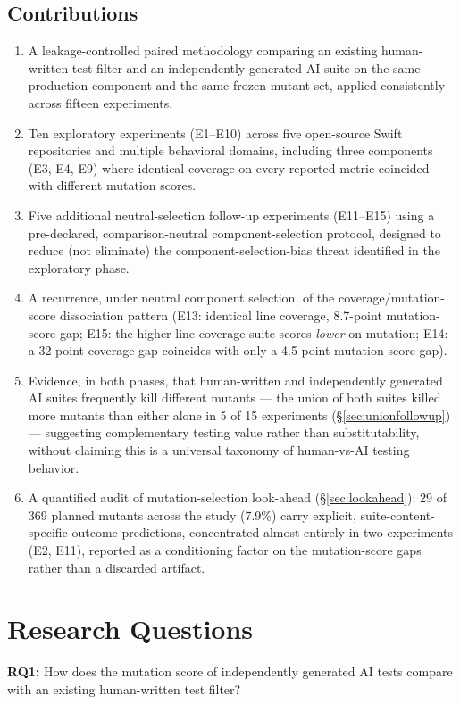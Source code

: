 \documentclass[10pt,conference]{IEEEtran}
\begin{document}
\subsection{Contributions}
\begin{enumerate}
\item A leakage-controlled paired methodology comparing an existing human-written test filter and an independently generated AI suite on the same production component and the same frozen mutant set, applied consistently across fifteen experiments.
\item Ten exploratory experiments (E1--E10) across five open-source Swift repositories and multiple behavioral domains, including three components (E3, E4, E9) where identical coverage on every reported metric coincided with different mutation scores.
\item Five additional neutral-selection follow-up experiments (E11--E15) using a pre-declared, comparison-neutral component-selection protocol, designed to reduce (not eliminate) the component-selection-bias threat identified in the exploratory phase.
\item A recurrence, under neutral component selection, of the coverage/mutation-score dissociation pattern (E13: identical line coverage, 8.7-point mutation-score gap; E15: the higher-line-coverage suite scores \emph{lower} on mutation; E14: a 32-point coverage gap coincides with only a 4.5-point mutation-score gap).
\item Evidence, in both phases, that human-written and independently generated AI suites frequently kill different mutants --- the union of both suites killed more mutants than either alone in 5 of 15 experiments (\S\ref{sec:unionfollowup}) --- suggesting complementary testing value rather than substitutability, without claiming this is a universal taxonomy of human-vs-AI testing behavior.
\item A quantified audit of mutation-selection look-ahead (\S\ref{sec:lookahead}): 29 of 369 planned mutants across the study (7.9\%) carry explicit, suite-content-specific outcome predictions, concentrated almost entirely in two experiments (E2, E11), reported as a conditioning factor on the mutation-score gaps rather than a discarded artifact.
\end{enumerate}

\section{Research Questions}
\textbf{RQ1:} How does the mutation score of independently generated AI tests compare with an existing human-written test filter?
\end{document}
